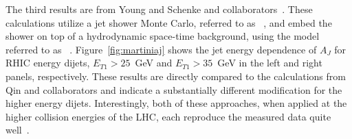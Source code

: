 
The third results are from Young and Schenke and
collaborators~\cite{Young:2011va}.  These calculations utilize a jet
shower Monte Carlo, referred to as \martini~\cite{Schenke:2009vr},
and embed the shower on top of a hydrodynamic space-time background,
using the model referred to as \music~\cite{Schenke:2010nt}.
Figure~\ref{fig:martiniaj} shows the jet energy dependence of $A_J$
for RHIC energy dijets, $E_{T1}>25$~GeV and $E_{T1}>35$~GeV in the
left and right panels, respectively.  These results are directly
compared to the calculations from Qin and collaborators and indicate
a substantially different modification for the higher energy dijets.
Interestingly, both of these approaches, when applied at the higher
collision energies of the LHC, each reproduce the measured data quite
well~\cite{Young:2011qx,Qin:2010mn}.

